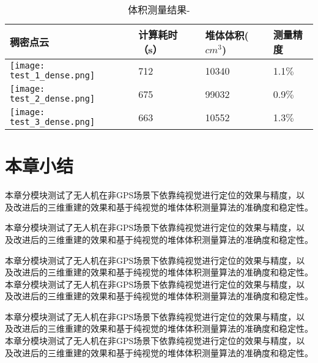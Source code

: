\begin{table}[h]
  \centering
  \caption{体积测量结果-\uppercase\expandafter{}}
  \label{tab:volume_test_3}
  \begin{tabular}{C{8cm}C{2.4cm}C{2.4cm}C{2.0cm}}
  \toprule
  \textbf{稠密点云} & \textbf{计算耗时（s）} & \textbf{堆体体积($cm^3$)} & \textbf{测量精度}\\
  \midrule
  \texttt{[image: test\_1\_dense.png]}  & 712 & 10340  &   1.1$\%$\\
  \texttt{[image: test\_2\_dense.png]}  & 675 & 99032  &   0.9$\%$\\
  \texttt{[image: test\_3\_dense.png]}  & 663 & 10552  &   1.3$\%$\\
  \bottomrule
  \end{tabular}
\end{table}


\section{本章小结}
本章分模块测试了无人机在非GPS场景下依靠纯视觉进行定位的效果与精度，以及改进后的三维重建的效果和基于纯视觉的堆体体积测量算法的准确度和稳定性。

本章分模块测试了无人机在非GPS场景下依靠纯视觉进行定位的效果与精度，以及改进后的三维重建的效果和基于纯视觉的堆体体积测量算法的准确度和稳定性。

本章分模块测试了无人机在非GPS场景下依靠纯视觉进行定位的效果与精度，以及改进后的三维重建的效果和基于纯视觉的堆体体积测量算法的准确度和稳定性。
本章分模块测试了无人机在非GPS场景下依靠纯视觉进行定位的效果与精度，以及改进后的三维重建的效果和基于纯视觉的堆体体积测量算法的准确度和稳定性。

本章分模块测试了无人机在非GPS场景下依靠纯视觉进行定位的效果与精度，以及改进后的三维重建的效果和基于纯视觉的堆体体积测量算法的准确度和稳定性。
本章分模块测试了无人机在非GPS场景下依靠纯视觉进行定位的效果与精度，以及改进后的三维重建的效果和基于纯视觉的堆体体积测量算法的准确度和稳定性。